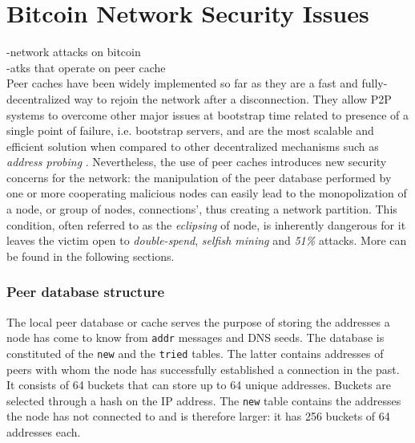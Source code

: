 \documentclass[12pt, letterpaper, twoside]{article}
\begin{document}
\section{Bitcoin Network Security Issues}\label{securityintro}
-network attacks on bitcoin\\
-atks that operate on peer cache\\
Peer caches have been widely implemented so far as they are a fast and fully-decentralized way to rejoin the network after a disconnection. They allow P2P systems to overcome other major issues at bootstrap time related to presence of a single point of failure, i.e. bootstrap servers, and are the most scalable and efficient solution when compared to other decentralized mechanisms such as \textit{address probing} \cite{decentrbootstrapp2p}.
Nevertheless, the use of peer caches introduces new security concerns for the network:
the manipulation of the peer database performed by one or more cooperating malicious nodes can easily lead to the monopolization of a node, or group of nodes, connections', thus creating a network partition. This condition, often referred to as the \textit{eclipsing} of node, is inherently dangerous for it leaves the victim open to \textit{double-spend}, \textit{selfish mining} and \textit{51\%} attacks. More can be found in the following sections.

\subsubsection{Peer database structure}\label{cachestruct}
The local peer database or cache serves the purpose of storing the addresses a node has come to know from \texttt{addr} messages and DNS seeds. The database is constituted of the \texttt{new} and the \texttt{tried} tables. The latter contains addresses of peers with whom the node has successfully established a connection in the past. It consists of 64 buckets that can store up to 64 unique addresses. Buckets are selected through a hash on the IP address. The \texttt{new} table contains the addresses the node has not connected to and is therefore larger: it has 256 buckets of 64 addresses each.\\
\end{document}
